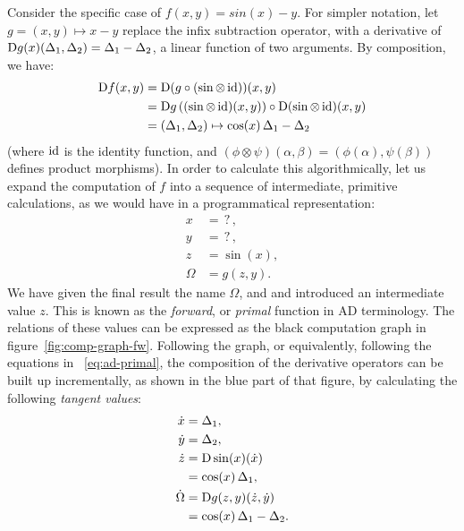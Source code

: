 Consider the specific case of \(f(x, y) = sin(x) - y\). For simpler notation, let
\(g = (x, y) \mapsto x - y\) replace the infix subtraction operator, with a derivative of
\(\mathop{}\!\mathrm{D} g(x)(\Delta_1, \Delta_2) = \Delta_1 - \Delta_2\), a linear function of two arguments.  By
composition, we have:
\begin{equation}
  \begin{aligned}
    \mathop{}\!\mathrm{D} f(x, y) &= \mathop{}\!\mathrm{D}(g \circ (\sin \otimes \operatorname{id}))(x, y) \\
    &= \mathop{}\!\mathrm{D} g\left( (\sin \otimes \operatorname{id})(x, y) \right) \circ \mathop{}\!\mathrm{D}(\sin \otimes \operatorname{id})(x, y) \\
    &= (\Delta_1, \Delta_2) \mapsto \cos(x) \, \Delta_1 - \Delta_2
  \end{aligned}
\end{equation}
(where \(\operatorname{id}\) is the identity function, and
\((\phi \otimes \psi)(\alpha, \beta) = (\phi(\alpha), \psi(\beta))\) defines product morphisms).  In
order to calculate this algorithmically, let us expand the computation of \(f\) into a sequence of
intermediate, primitive calculations, as we would have in a programmatical representation:
\begin{equation}
  \label{eq:ad-primal}
  \begin{aligned}
    x &= \operatorname{?}, \\
    y &= \operatorname{?}, \\
    z &= \sin(x), \\
    \Omega &= g(z, y).
  \end{aligned}
\end{equation}
We have given the final result the name \(\Omega\), and and introduced an intermediate value \(z\).
This is known as the \emph{forward}, or \emph{primal} function in AD terminology.  The relations of
these values can be expressed as the black computation graph in figure~\ref{fig:comp-graph-fw}.
Following the graph, or equivalently, following the equations in ~\eqref{eq:ad-primal}, the
composition of the derivative operators can be built up incrementally, as shown in the blue part of
that figure, by calculating the following \emph{tangent values}:
\begin{equation}
  \label{eq:ad-forward}
  \begin{aligned}
    \dot{x} &= \Delta_1, \\
    \dot{y} &= \Delta_2, \\
    \dot{z} &= \mathop{}\!\mathrm{D}\sin(x)(\dot{x}) \\
    &= \cos(x) \, \Delta_1, \\
    \dot{\Omega} &= \mathop{}\!\mathrm{D} g(z, y)(\dot{z}, \dot{y}) \\
    &= \cos(x) \, \Delta_1 - \Delta_2.
  \end{aligned}
\end{equation}
